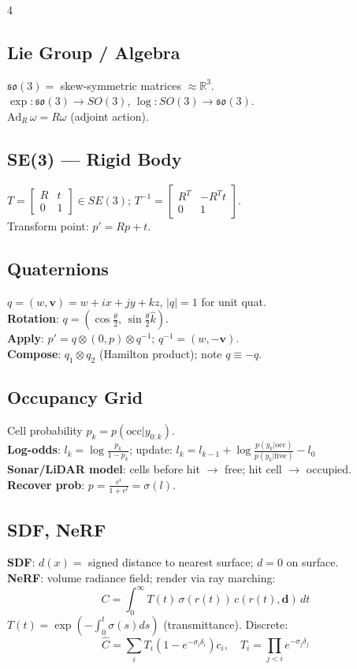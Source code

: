 \documentclass[8pt,landscape]{article}
\begin{document}
\begin{multicols}{4}
\subsection{Lie Group / Algebra}
$\mathfrak{so}(3)=$ skew-symmetric matrices $\approx\mathbb{R}^3$.\\
$\exp:\mathfrak{so}(3)\to SO(3)$, $\log:SO(3)\to\mathfrak{so}(3)$.\\
$\text{Ad}_R\,\omega=R\omega$ (adjoint action).

\subsection{SE(3) — Rigid Body}
$T=\begin{bmatrix}R&t\\0&1\end{bmatrix}\in SE(3)$; $T^{-1}=\begin{bmatrix}R^T&-R^Tt\\0&1\end{bmatrix}$.\\
Transform point: $p'=Rp+t$.

\subsection{Quaternions}
$q=(w,\mathbf{v})=w+ix+jy+kz$, $|q|=1$ for unit quat.\\
\textbf{Rotation}: $q=(\cos\frac{\theta}{2},\,\sin\frac{\theta}{2}\hat{k})$.\\
\textbf{Apply}: $p'=q\otimes(0,p)\otimes q^{-1}$; $q^{-1}=(w,-\mathbf{v})$.\\
\textbf{Compose}: $q_1\otimes q_2$ (Hamilton product); note $q\equiv-q$.

\subsection{Occupancy Grid}
Cell probability $p_k=p(\text{occ}|y_{0:k})$.\\
\textbf{Log-odds}: $l_k=\log\frac{p_k}{1-p_k}$; update: $l_k=l_{k-1}+\log\frac{p(y_k|\text{occ})}{p(y_k|\text{free})}-l_0$\\
\textbf{Sonar/LiDAR model}: cells before hit $\to$ free; hit cell $\to$ occupied.\\
\textbf{Recover prob}: $p=\frac{e^l}{1+e^l}=\sigma(l)$.

\subsection{SDF, NeRF}
\textbf{SDF}: $d(x)=$ signed distance to nearest surface; $d=0$ on surface.\\
\textbf{NeRF}: volume radiance field; render via ray marching:
\[C=\int_0^\infty T(t)\,\sigma(r(t))\,c(r(t),\mathbf{d})\,dt\]
$T(t)=\exp(-\int_0^t\sigma(s)ds)$ (transmittance). Discrete:
\[\hat{C}=\sum_i T_i(1-e^{-\sigma_i\delta_i})c_i,\quad T_i=\prod_{j<i}e^{-\sigma_j\delta_j}\]


\end{multicols}
\end{document}

